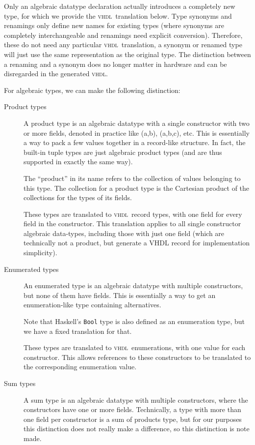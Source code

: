 \documentclass[conference,pdf,a4paper,10pt,final,twoside,twocolumn]{IEEEtran}
\def\VHDL{\textsc{vhdl}}
\def\hs#1{\texttt{#1}}
\begin{document}
    Only an algebraic datatype declaration actually introduces a
    completely new type, for which we provide the \VHDL\ translation
    below. Type synonyms and renamings only define new names for
    existing types (where synonyms are completely interchangeable and
    renamings need explicit conversion). Therefore, these do not need
    any particular \VHDL\ translation, a synonym or renamed type will
    just use the same representation as the original type. The
    distinction between a renaming and a synonym does no longer matter
    in hardware and can be disregarded in the generated \VHDL.

    For algebraic types, we can make the following distinction: 

    \begin{description}

      \item[Product types]
        A product type is an algebraic datatype with a single constructor with
        two or more fields, denoted in practice like (a,b), (a,b,c), etc. This
        is essentially a way to pack a few values together in a record-like
        structure. In fact, the built-in tuple types are just algebraic product
        types (and are thus supported in exactly the same way).

        The ``product'' in its name refers to the collection of values belonging
        to this type. The collection for a product type is the Cartesian
        product of the collections for the types of its fields.

        These types are translated to \VHDL\ record types, with one field for
        every field in the constructor. This translation applies to all single
        constructor algebraic data-types, including those with just one
        field (which are technically not a product, but generate a VHDL
        record for implementation simplicity).
      \item[Enumerated types]
        An enumerated type is an algebraic datatype with multiple constructors, but
        none of them have fields. This is essentially a way to get an
        enumeration-like type containing alternatives.

        Note that Haskell's \hs{Bool} type is also defined as an
        enumeration type, but we have a fixed translation for that.

        These types are translated to \VHDL\ enumerations, with one value for
        each constructor. This allows references to these constructors to be
        translated to the corresponding enumeration value.
      \item[Sum types]
        A sum type is an algebraic datatype with multiple constructors, where
        the constructors have one or more fields. Technically, a type with
        more than one field per constructor is a sum of products type, but
        for our purposes this distinction does not really make a
        difference, so this distinction is note made.


\end{description}
\end{document}
